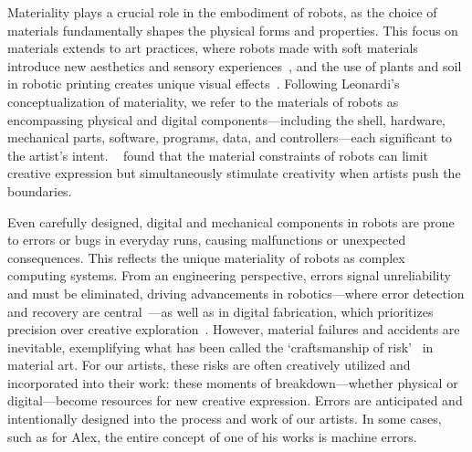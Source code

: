 Materiality plays a crucial role in the embodiment of robots, as the choice of materials fundamentally shapes the physical forms and properties. This focus on materials extends to art practices, where robots made with soft materials introduce new aesthetics and sensory experiences~\cite{jorgensen2019constructing, belling2021rhythm}, and the use of plants and soil in robotic printing creates unique visual effects~\cite{harmon2022living}. Following Leonardi's ~\cite{leonardi2012materiality} conceptualization of materiality, we refer to the materials of robots as encompassing physical and digital components---including the shell, hardware, mechanical parts, software, programs, data, and controllers---each significant to the artist's intent. ~\citet{nam2023dreams} found that the material constraints of robots can limit creative expression but simultaneously stimulate creativity when artists push the boundaries.


Even carefully designed, digital and mechanical components in robots are prone to errors or bugs in everyday runs, causing malfunctions or unexpected consequences. This reflects the unique materiality of robots as complex computing systems. From an engineering perspective, errors signal unreliability and must be eliminated, driving advancements in robotics---where error detection and recovery are central~\cite{gini1987monitoring}---as well as in digital fabrication, which prioritizes precision over creative exploration~\cite{yildirim2020digital}. %
However, material failures and accidents are inevitable, exemplifying what has been called the `craftsmanship of risk'~\cite{glaveanu_distributed_2014} in material art. For our artists, these risks are often creatively utilized and incorporated into their work: these moments of breakdown---whether physical or digital---become resources for new creative expression. Errors are anticipated and intentionally designed into the process and work of our artists. In some cases, such as for Alex, the entire concept of one of his works is machine errors.

